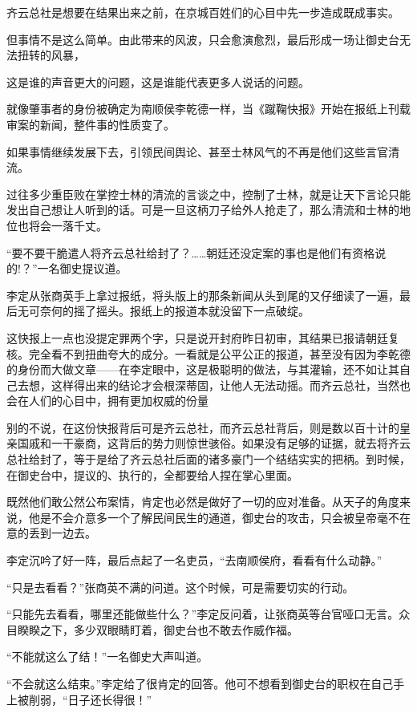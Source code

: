 齐云总社是想要在结果出来之前，在京城百姓们的心目中先一步造成既成事实。

但事情不是这么简单。由此带来的风波，只会愈演愈烈，最后形成一场让御史台无法扭转的风暴，

这是谁的声音更大的问题，这是谁能代表更多人说话的问题。

就像肇事者的身份被确定为南顺侯李乾德一样，当《蹴鞠快报》开始在报纸上刊载审案的新闻，整件事的性质变了。

如果事情继续发展下去，引领民间舆论、甚至士林风气的不再是他们这些言官清流。

过往多少重臣败在掌控士林的清流的言谈之中，控制了士林，就是让天下言论只能发出自己想让人听到的话。可是一旦这柄刀子给外人抢走了，那么清流和士林的地位也将会一落千丈。

“要不要干脆遣人将齐云总社给封了？……朝廷还没定案的事也是他们有资格说的!？”一名御史提议道。

李定从张商英手上拿过报纸，将头版上的那条新闻从头到尾的又仔细读了一遍，最后无可奈何的摇了摇头。报纸上的报道本就没留下一点破绽。

这快报上一点也没提定罪两个字，只是说开封府昨日初审，其结果已报请朝廷复核。完全看不到扭曲夸大的成分。一看就是公平公正的报道，甚至没有因为李乾德的身份而大做文章——在李定眼中，这是极聪明的做法，与其灌输，还不如让其自己去想，这样得出来的结论才会根深蒂固，让他人无法动摇。而齐云总社，当然也会在人们的心目中，拥有更加权威的份量

别的不说，在这份快报背后可是齐云总社，而齐云总社背后，则是数以百十计的皇亲国戚和一干豪商，这背后的势力则惊世骇俗。如果没有足够的证据，就去将齐云总社给封了，等于是给了齐云总社后面的诸多豪门一个结结实实的把柄。到时候，在御史台中，提议的、执行的，全都要给人捏在掌心里面。

既然他们敢公然公布案情，肯定也必然是做好了一切的应对准备。从天子的角度来说，他是不会介意多一个了解民间民生的通道，御史台的攻击，只会被皇帝毫不在意的丢到一边去。

李定沉吟了好一阵，最后点起了一名吏员，“去南顺侯府，看看有什么动静。”

“只是去看看？”张商英不满的问道。这个时候，可是需要切实的行动。

“只能先去看看，哪里还能做些什么？”李定反问着，让张商英等台官哑口无言。众目睽睽之下，多少双眼睛盯着，御史台也不敢去作威作福。

“不能就这么了结！”一名御史大声叫道。

“不会就这么结束。”李定给了很肯定的回答。他可不想看到御史台的职权在自己手上被削弱，“日子还长得很！”

